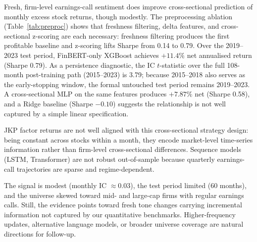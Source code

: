 Fresh, firm-level earnings-call sentiment does improve cross-sectional prediction of monthly excess stock returns, though modestly. The preprocessing ablation (Table~\ref{tab:preproc}) shows that freshness filtering, delta features, and cross-sectional z-scoring are each necessary: freshness filtering produces the first profitable baseline and z-scoring lifts Sharpe from 0.14 to 0.79. Over the 2019--2023 test period, FinBERT-only XGBoost achieves $+11.4\%$ net annualised return (Sharpe 0.79). As a persistence diagnostic, the IC $t$-statistic over the full 108-month post-training path (2015--2023) is 3.79; because 2015--2018 also serves as the early-stopping window, the formal untouched test period remains 2019--2023. A cross-sectional MLP on the same features produces $+7.87\%$ net (Sharpe 0.58), and a Ridge baseline (Sharpe $-0.10$) suggests the relationship is not well captured by a simple linear specification.

JKP factor returns are not well aligned with this cross-sectional strategy design: being constant across stocks within a month, they encode market-level time-series information rather than firm-level cross-sectional differences. Sequence models (LSTM, Transformer) are not robust out-of-sample because quarterly earnings-call trajectories are sparse and regime-dependent.

The signal is modest (monthly IC $\approx 0.03$), the test period limited (60 months), and the universe skewed toward mid- and large-cap firms with regular earnings calls. Still, the evidence points toward fresh tone changes carrying incremental information not captured by our quantitative benchmarks. Higher-frequency updates, alternative language models, or broader universe coverage are natural directions for follow-up.
